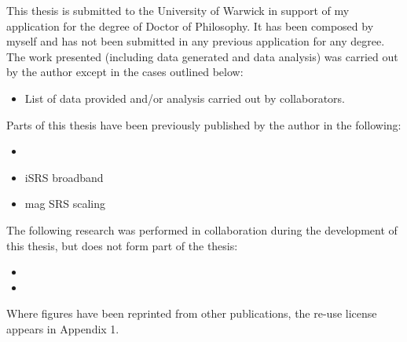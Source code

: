 
\begin{thesisdeclaration}
%

This thesis is submitted to the University of Warwick in support of my application for the degree of Doctor of Philosophy. It has been composed by myself and has not been submitted in any previous application for any degree. \\


\noindent The work presented (including data generated and data analysis) was carried out by the author except in the cases outlined below:
\begin{singlespacing}
\begin{itemize}
    \item List of data provided and/or analysis carried out by collaborators.
\end{itemize}{}
\end{singlespacing}

\noindent Parts of this thesis have been previously published by the author in the following:
\begin{singlespacing}
\begin{itemize}
    \item {}
    \item iSRS broadband
    \item mag SRS scaling
\end{itemize}{}
\end{singlespacing}

\noindent The following research was performed in collaboration during the development of this thesis, but does not form part of the thesis:
\begin{singlespacing}
\begin{itemize}
\item {}
	\item {}
\end{itemize}
\end{singlespacing}

\noindent Where figures have been reprinted from other publications, the re-use license appears in Appendix 1.

\end{thesisdeclaration}
